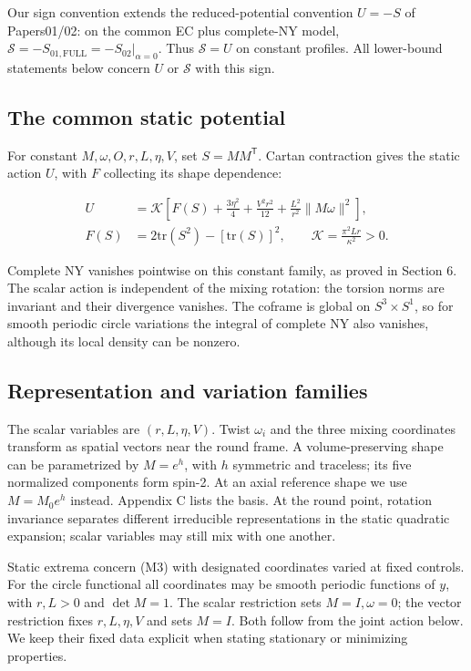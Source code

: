 Our sign convention extends the reduced-potential convention $U=-S$ of Papers01/02: on the common EC plus complete-NY model, $\mathcal S=-S_{\mathrm{01,FULL}}=-S_{\mathrm{02}}|_{\alpha=0}$. Thus $\mathcal S=U$ on constant profiles. All lower-bound statements below concern $U$ or $\mathcal S$ with this sign.

\subsection{The common static potential}

For constant $M,\omega,O,r,L,\eta,V$, set $S=MM^{\mathsf T}$. Cartan contraction gives the static action $U$, with $F$ collecting its shape dependence:

\begin{equation}\tag{M3}\label{eq:M3}
\begin{aligned}
U&=\mathcal K\left[F(S)+\frac{3\eta^2}{4}
+\frac{V^2r^2}{12}+\frac{L^2}{r^2}\lVert M\omega\rVert^2\right],\\
F(S)&=2\mathrm{tr}(S^2)-[\mathrm{tr}(S)]^2,\qquad
\mathcal K=\frac{\pi^2Lr}{\kappa^2}>0.
\end{aligned}
\end{equation}

Complete NY vanishes pointwise on this constant family, as proved in Section 6. The scalar action is independent of the mixing rotation: the torsion norms are invariant and their divergence vanishes. The coframe is global on $S^3\times S^1$, so for smooth periodic circle variations the integral of complete NY also vanishes, although its local density can be nonzero.

\subsection{Representation and variation families}

The scalar variables are $(r,L,\eta,V)$. Twist $\omega_i$ and the three mixing coordinates transform as spatial vectors near the round frame. A volume-preserving shape can be parametrized by $M=e^h$, with $h$ symmetric and traceless; its five normalized components form spin-2. At an axial reference shape we use $M=M_0e^h$ instead. Appendix C lists the basis. At the round point, rotation invariance separates different irreducible representations in the static quadratic expansion; scalar variables may still mix with one another.

Static extrema concern (M3) with designated coordinates varied at fixed controls. For the circle functional all coordinates may be smooth periodic functions of $y$, with $r,L>0$ and $\det M=1$. The scalar restriction sets $M=I,\omega=0$; the vector restriction fixes $r,L,\eta,V$ and sets $M=I$. Both follow from the joint action below. We keep their fixed data explicit when stating stationary or minimizing properties.

